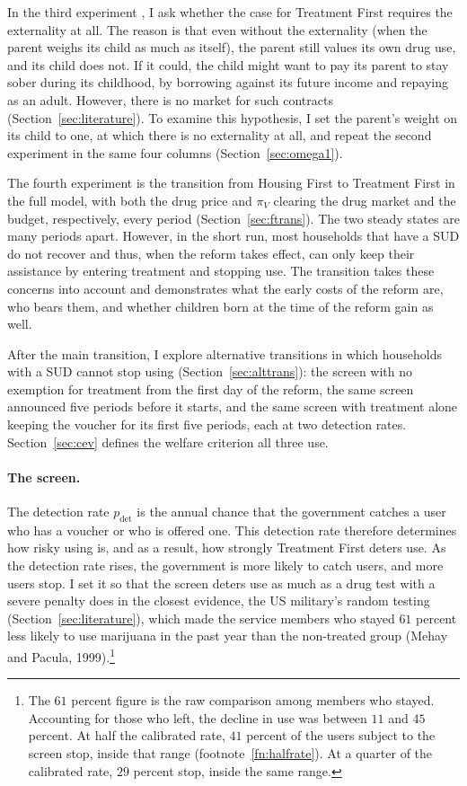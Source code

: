 \documentclass[10pt]{article}
\begin{document}
 In the third experiment , I ask whether the case for Treatment First  requires the externality at all.  The reason is that even without the externality (when the parent  weighs its child as much as  itself), the parent still values its own drug use,  and its child does not. If it could, the child  might want to pay its parent to  stay sober during its childhood, by borrowing against its future income and repaying as an adult. However,  there is  no market for such contracts (Section~\ref{sec:literature}). To  examine this hypothesis, I set the parent's weight on its child to one, at which there is no externality at all, and repeat the second experiment in the same four columns (Section~\ref{sec:omega1}).

The fourth experiment is the transition from Housing First to Treatment First in the full model, with both the drug price and $\pi_V$ clearing the drug market and the budget, respectively, every period (Section~\ref{sec:ftrans}).   The two steady states are many periods apart. However, in the short run, most households that have a SUD do not recover and thus, when the reform takes effect, can only keep their assistance by entering treatment and stopping use. The transition takes these concerns into account and demonstrates what the early costs of the reform are, who bears them, and whether children born at the time of the reform gain as well.

After the main transition, I explore alternative transitions in which households with a SUD cannot stop using (Section~\ref{sec:alttrans}): the screen with no exemption for treatment from the first day of the reform, the same screen announced five periods before it starts, and the same screen with treatment alone keeping the voucher for its first five periods, each at two detection rates. Section~\ref{sec:cev} defines the welfare criterion all three use.

\paragraph{The screen.}    The detection rate $p_{\mathrm{det}}$ is the annual chance that the government catches a user who has a voucher or who is offered one. This detection rate therefore determines how risky using is, and as a result, how strongly Treatment First deters use. As the detection rate rises, the government is more likely to catch users, and more users stop. I set it so that the screen deters use as much as a drug test with a severe penalty does in the closest evidence, the US military's random testing (Section~\ref{sec:literature}), which made the service members who stayed  $61$ percent less likely to use marijuana in the past year than the non-treated group (Mehay and Pacula, 1999).\footnote{  The $61$ percent figure is the raw comparison among members who stayed. Accounting for those who left, the decline in use was between $11$ and $45$ percent. At half the calibrated rate, $41$ percent of the users subject to the screen stop, inside that range (footnote~\ref{fn:halfrate}). At a quarter of the calibrated rate,
$29$ percent stop, inside the same range.}
\end{document}
